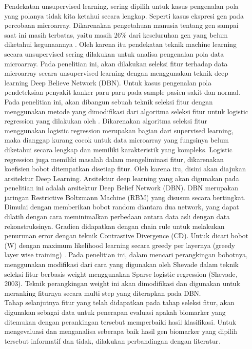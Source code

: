 Pendekatan unsupervised learning, sering dipilih untuk kasus pengenalan pola yang polanya tidak kita ketahui secara lengkap. Seperti kasus ekspresi gen pada percobaan microarray. Dikarenakan pengetahuan manusia tentang gen sampai saat ini masih terbatas, yaitu masih 26\% dari keseluruhan gen yang belum diketahui kegunaannya \citep{haggstrom2014diagram}. Oleh karena itu pendekatan teknik machine learning secara unsupervised sering dilakukan untuk analisa pengenalan pola data microarray. Pada penelitian ini, akan dilakukan seleksi fitur terhadap data microarray secara unsupervised learning dengan menggunakan teknik deep learning Deep Believe Network (DBN). Untuk kasus pengenalan pola pendeteksian penyakit kanker paru-paru pada sample pasien sakit dan normal. \\

Pada penelitian ini, akan dibangun sebuah teknik seleksi fitur dengan menggunakan metode yang dimodifikasi dari algoritma seleksi fitur untuk logistic regression yang dilakukan oleh \cite{shevade2003simple}. Dikarenakan algoritma seleksi fitur menggunakan logistic regression merupakan bagian dari supervised learning, maka dianggap kurang cocok untuk data microarray yang fungsinya belum diketahui secara lengkap dan memiliki karakteristik yang kompleks. Logistic regression juga memiliki masalah dalam  mengeliminasi fitur, dikarenakan koefisien bobot ditempatkan disetiap fitur. Oleh karena itu, disini akan diajukan arsitektur Deep Learning. Arsitektur deep learning yang akan digunakan pada penelitian ini adalah arsitektur Deep Belief Network (DBN). DBN merupakan jaringan Restrictive Boltzmann Machine (RBM) yang disusun secara bertingkat. Dimulai dengan memberikan bobot random diantara dua network, yang dapat dilatih dengan cara meminimalkan perbedaan antara data asli dengan data rekonstruksinya. Gradien didapatkan dengan chain rule untuk melakukan penurunan error dengan teknik Contrastive Divergence (CD). Untuk dicari bobot (W) dengan maximum likelihood learning  secara greedy per layernya (greedy layer wise training) \cite{hinton2006reducing}. Pada penelitian ini, dalam mencari perangkingan bobotnya, menggunakan modifikasi dari cara yang digunakan oleh Shevade \cite{shevade2003simple} dalam teknik seleksi fitur berbasis weight menggunakan Sparse logistic regression (Shevade, 2003). Teknik perangkingan weight ini akan dimodifikasi dan digunakan untuk  meranking fiturnya secara multi step yang diterapkan pada DBN. \\

Tahap selanjutnya fitur yang telah didapatkan pada tahap seleksi fitur, akan digunakan sebagai data untuk penerapan evaluasi apakah biomarker yang ditemukan dengan perankingan tersebut memperbaiki hasil klasifikasi. Untuk mengevaluasi dan menganalisa seberapa baik hasil gen biomarker yang dipilih tersebut informatif dan tidak, dilakukan perbandingan dengan literatur. \\






